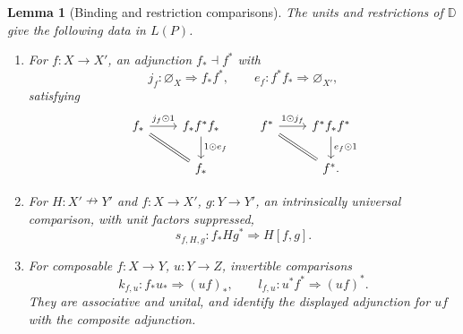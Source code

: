 \documentclass[11pt,reqno]{amsart}
\theoremstyle{plain}
\newtheorem{lemma}[theorem]{Lemma}
\theoremstyle{definition}
\theoremstyle{remark}
\numberwithin{equation}{section}
\newcommand{\D}{\mathbb D}
\newcommand{\harr}{\mathrel{\nrightarrow}}
\newcommand{\cell}{\mathrel{\Longrightarrow}}
\newcommand{\emp}[1]{\varnothing_{#1}}
\newcommand{\wh}{\mathbin{\odot}}
\begin{document}
\begin{lemma}[Binding and restriction comparisons]\label{lem:binding}
The units and restrictions of $\D$ give the following data in $L(P)$.
\begin{enumerate}
\item For $f:X\to X'$, an adjunction $f_*\dashv f^*$ with
\[
 j_f:\emp X\cell f_*f^*,\qquad
 e_f:f^*f_*\cell\emp{X'},
\]
satisfying
\begin{equation}\label{eq:triangles}
\begin{tikzcd}[column sep=2.2em]
f_* \arrow[r,"j_f\wh1"] \arrow[dr,equal] &
f_*f^*f_* \arrow[d,"1\wh e_f"]\\
& f_*
\end{tikzcd}
\qquad
\begin{tikzcd}[column sep=2.2em]
f^* \arrow[r,"1\wh j_f"] \arrow[dr,equal] &
f^*f_*f^* \arrow[d,"e_f\wh1"]\\
& f^*.
\end{tikzcd}
\end{equation}
\item For $H:X'\harr Y'$ and $f:X\to X'$, $g:Y\to Y'$, an
intrinsically universal comparison, with unit factors suppressed,
\begin{equation}\label{eq:restrictioncomparison}
 s_{f,H,g}:f_*Hg^*\cell H[f,g].
\end{equation}
\item For composable $f:X\to Y$, $u:Y\to Z$, invertible comparisons
\[
 k_{f,u}:f_*u_*\cell(uf)_*,\qquad
 l_{f,u}:u^*f^*\cell(uf)^*.
\]
They are associative and unital, and identify the displayed adjunction
for $uf$ with the composite adjunction.
\end{enumerate}
\end{lemma}
\end{document}
